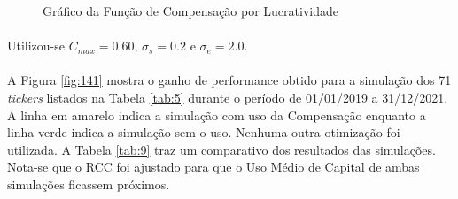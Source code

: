 
\begin{figure}[!htb]
    \centering
    \begin{center}
    \end{center}
    \caption{Gráfico da Função de Compensação por Lucratividade}
    \label{fig:140}
\end{figure}

\paragraph{} Utilizou-se \begin{math} C_{max} = 0.60\end{math}, \begin{math} \sigma_s = 0.2 \end{math} e \begin{math} \sigma_e = 2.0 \end{math}.

\paragraph{} A Figura \ref{fig:141} mostra o ganho de performance obtido para a simulação dos 71 \textit{tickers} listados na Tabela \ref{tab:5} durante o período de 01/01/2019 a 31/12/2021. A linha em amarelo indica a simulação com uso da Compensação enquanto a linha verde indica a simulação sem o uso. Nenhuma outra otimização foi utilizada. A Tabela \ref{tab:9} traz um comparativo dos resultados das simulações. Nota-se que o RCC foi ajustado para que o Uso Médio de Capital de ambas simulações ficassem próximos.

